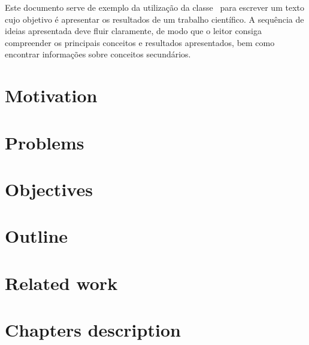 Este documento serve de exemplo da utilização da classe \unbcic\ para escrever
um texto cujo objetivo é apresentar os resultados de um trabalho científico. A
sequência de ideias apresentada deve fluir claramente, de modo que o leitor
consiga compreender os principais conceitos e resultados apresentados, bem como
encontrar informações sobre conceitos secundários.

\section{Motivation}

\section{Problems}

\section{Objectives}

\section{Outline}

\section{Related work}

\section{Chapters description}